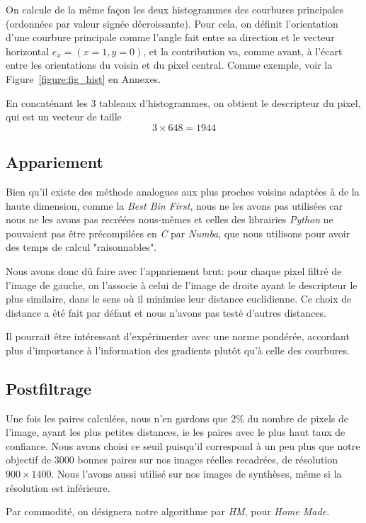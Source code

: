 \documentclass[
	a4paper, %
	10pt, %
	unnumberedsections, %
	twoside, %
]{LTJournalArticle}
\begin{document}
On calcule de la même façon les deux histogrammes des courbures principales
(ordonnées par valeur signée décroissante). Pour cela,
on définit l'orientation d'une courbure principale comme l'angle fait entre sa
direction et le vecteur horizontal $e_x=(x=1, y=0)$, et la contribution va,
comme avant, à l'écart entre les orientations du voisin et du pixel central.
Comme exemple, voir la Figure~\ref{figure:fig_hist} en Annexes.

En concaténant les $3$ tableaux d'histogrammes, on obtient le descripteur du pixel,
qui est un vecteur de taille $$3 \times 648 = 1944$$


\subsection{Appariement}

Bien qu'il existe des méthode analogues aux plus proches voisins adaptées à de la haute dimension,
comme la \textit{Best Bin First}, nous ne les avons pas utilisées car nous ne les avons pas
recréées nous-mêmes et celles des librairies \textit{Python} ne pouvaient pas être
précompilées en \textit{C} par \textit{Numba}, que nous utilisons pour avoir des temps
de calcul "raisonnables".

Nous avons donc dû faire avec l'appariement brut: pour chaque pixel filtré de l'image de gauche,
on l'associe à celui de l'image de droite ayant le descripteur le plus similaire,
dans le sens où il minimise leur distance euclidienne.
Ce choix de distance a été fait par défaut et nous n'avons pas testé d'autres distances.

Il pourrait être intéressant d'expérimenter avec une norme pondérée, accordant plus d'importance
à l'information des gradients plutôt qu'à celle des courbures.

\subsection{Postfiltrage}
Une fois les paires calculées, nous n'en gardons que $2 \%$ du nombre de pixels de l'image,
ayant les plus petites distances, ie les paires avec le plus haut taux
de confiance. Nous avons choisi ce seuil puisqu'il correspond à un peu plus que
notre objectif de $3000$ bonnes paires sur nos images réelles recadrées, de résolution
$900 \times 1400$.
Nous l'avons aussi
utilisé sur nos images de synthèses, même si la résolution est inférieure.

Par commodité, on désignera notre algorithme
par \textit{HM}, pour \textit{Home Made}.
\end{document}
